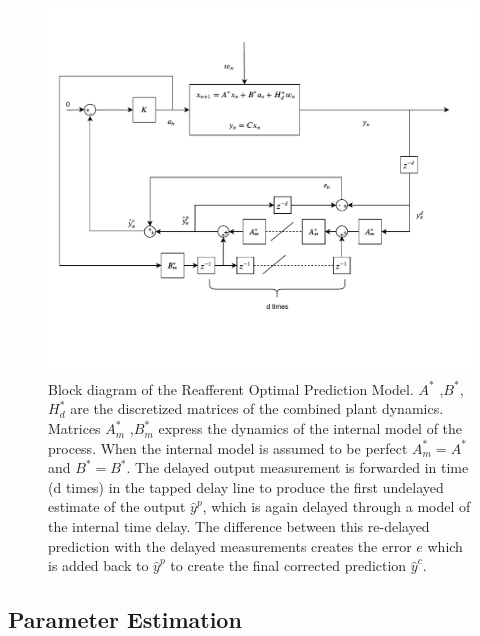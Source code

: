  \begin{figure}[ht]
    \centering

    \includegraphics[width=\linewidth,trim={0 2.8cm 0 2cm},clip]{images/low_level_block.pdf}
    \caption{Block diagram of the Reafferent Optimal Prediction Model. \ensuremath{A^*} ,\ensuremath{B^*}, \ensuremath{H_d^*} are the discretized matrices of the combined plant dynamics. Matrices \ensuremath{A_m^*} ,\ensuremath{B_m^*} express the dynamics of the internal model of the process. When the internal model is assumed to be perfect \ensuremath{A_m^*=A^*} and \ensuremath{B^*=B^*}. The delayed output measurement is forwarded in time (d times) in the tapped delay line to produce the first undelayed estimate of the output \ensuremath{\hat{y}^p}, which is again delayed through a model of the  internal time delay. The difference between this re-delayed prediction with the delayed measurements creates the error \ensuremath{e} which is added back to  \ensuremath{\hat{y}^p}  to create the final corrected prediction \ensuremath{\hat{y}^c}. }
    \label{fig:paper4}
\end{figure}

\subsection{Parameter Estimation }

